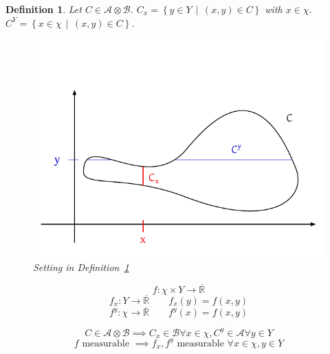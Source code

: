 \documentclass[a4paper]{article}
\newcounter{lecref}[section]
\numberwithin{lecref}{section}
\theoremstyle{break}
\newtheorem{definition}[lecref]{Definition}
\newcommand{\SetDef}[2]{\left\{#1\,\mid\,#2\right\}}
\begin{document}
\begin{definition}
  \label{def:fub}
  Let $C \in \mathcal A \otimes \mathcal B$. $C_x = \SetDef{y \in Y}{(x, y) \in C}$ with $x \in \chi$.
  $C^Y = \SetDef{x \in \chi}{(x, y) \in C}$.

  \begin{figure}[!ht]
    \begin{center}
      \includegraphics{img/fubini_theorem.pdf}
      \caption{Setting in Definition~\ref{def:fub}}
      \label{img:fubini}
    \end{center}
  \end{figure}

  \[ f: \chi \times Y \to \overline{\mathbb R} \]
  \[ f_x: Y \to \overline{\mathbb R} \qquad f_x(y) = f(x, y) \]
  \[ f^y: \chi \to \overline{\mathbb R} \qquad f^y(x) = f(x, y) \]
\end{definition}

\begin{theorem}
  \[ C \in \mathcal A \otimes \mathcal B \implies C_x \in \mathcal B \forall x \in \chi, C^y \in \mathcal A \forall y \in Y \]
  \[ f \text{ measurable } \implies f_x, f^y \text{ measurable } \forall x \in \chi, y \in Y \]
\end{theorem}
\end{document}
